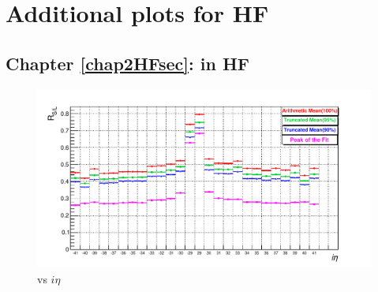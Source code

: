 
\chapter{Additional plots for HF} %

\label{AppendixA} %

\section{Chapter \ref{chap2HFsec}: \ratiosl in HF}

\begin{figure}[h!]
\centering
\includegraphics[width=0.8\linewidth]{../Figures/Chap2/ImageFiles_HF/Ratio/MeanvsFit.pdf}
\caption{\ratiosl vs $i \eta$}
\label{MeanvsFit}
\end{figure}


